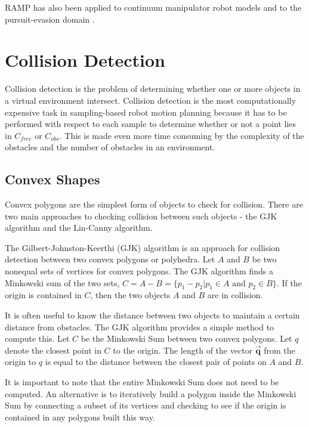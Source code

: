 \documentclass[10pt,conference]{ieeeconf}
\begin{document}
RAMP has also been applied to continuum manipulator robot models \cite{xiao2010real} and to the pursuit-evasion domain \cite{annas2009intelligent}.



\section{Collision Detection} \label{sec:coll}
	
	Collision detection is the problem of determining whether one or more objects in a virtual environment intersect. Collision detection is the most computationally expensive task in sampling-based robot motion planning because it has to be performed with respect to each sample to determine whether or not a point lies in $C_{free}$ or $C_{obs}$. This is made even more time consuming by the complexity of the obstacles and the number of obstacles in an environment.
	
\subsection{Convex Shapes}
	
	Convex polygons are the simplest form of objects to check for collision. There are two main approaches to checking collision between such objects - the GJK algorithm and the Lin-Canny algorithm.
	
	The Gilbert-Johnston-Keerthi (GJK) algorithm \cite{gilbert1988fast} is an approach for collision detection between two convex polygons or polyhedra. Let $A$ and $B$ be two nonequal sets of vertices for convex polygons. The GJK algorithm finds a Minkowski sum of the two sets, $C = A - B = \{p_1 - p_2 | p_1 \in A \text{ and } p_2 \in B\}$. If the origin is contained in $C$, then the two objects $A$ and $B$ are in collision.
	
	It is often useful to know the distance between two objects to maintain a certain distance from obstacles. The GJK algorithm provides a simple method to compute this. Let $C$ be the Minkowski Sum between two convex polygons. Let $q$ denote the closest point in $C$ to the origin. The length of the vector $\vec{\textbf{q}}$ from the origin to $q$ is equal to the distance between the closest pair of points on $A$ and $B$. 
	
	
	It is important to note that the entire Minkowski Sum does not need to be computed. An alternative is to iteratively build a polygon inside the Minkowski Sum by connecting a subset of its vertices and checking to see if the origin is contained in any polygons built this way. 
	
\end{document}
